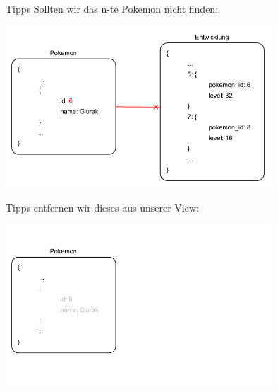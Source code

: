 \begin{frame}{Tipps}
    Sollten wir das n-te Pokemon nicht finden:

    \begin{center}
        \includegraphics[width=0.75\textwidth]{pictures/example_6.pdf}
    \end{center}
\end{frame}

\begin{frame}{Tipps}
    entfernen wir dieses aus unserer View:

    \begin{center}
        \includegraphics[width=0.75\textwidth]{pictures/example_7.pdf}
    \end{center}
\end{frame}